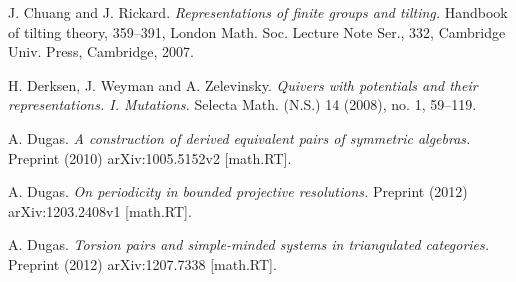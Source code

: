 \documentclass{amsart}
\begin{document}
\begin{thebibliography}{99}




 J. Chuang and J. Rickard.  \emph{Representations of finite groups and tilting.} Handbook of tilting theory, 359--391, London Math. Soc. Lecture Note Ser., 332, Cambridge Univ. Press, Cambridge, 2007.

 H. Derksen, J. Weyman and A. Zelevinsky.  \emph{Quivers with potentials and their representations. I. Mutations.} Selecta Math. (N.S.) 14 (2008), no. 1, 59--119.



 A. Dugas. \emph{A construction of derived equivalent pairs of symmetric algebras.}  Preprint (2010) arXiv:1005.5152v2 [math.RT].

 A. Dugas.  \emph{On periodicity in bounded projective resolutions.}  Preprint (2012) arXiv:1203.2408v1 [math.RT].


 A.  Dugas.  \emph{Torsion pairs and simple-minded systems in triangulated categories.}  Preprint (2012) arXiv:1207.7338 [math.RT].






\end{thebibliography}
\end{document}
